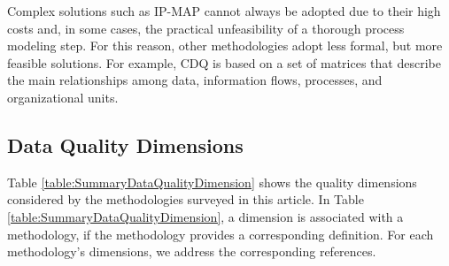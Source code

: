 \documentclass[pdftex,english,oribibl]{llncs}
\begin{document}
Complex solutions such as IP-MAP cannot always be adopted due to their high costs and, in some cases, the practical unfeasibility of a thorough process modeling step.
For this reason, other methodologies adopt less formal, but more feasible solutions.
For example, CDQ is based on a set of matrices that describe the main relationships among data, information flows, processes, and organizational units.
\begin{comment}
The relationship between organizational units and processes has also been modeled in extensions of IP-MAP proposed in the literature [Scannapieco et al. 2002].
\end{comment}

\subsection{Data Quality Dimensions}
Table \ref{table:SummaryDataQualityDimension} shows the quality dimensions considered by the methodologies surveyed in this article.
In Table \ref{table:SummaryDataQualityDimension}, a dimension is associated with a methodology, if the methodology provides a corresponding definition.
For each methodology’s dimensions, we address the corresponding references.
\end{document}
